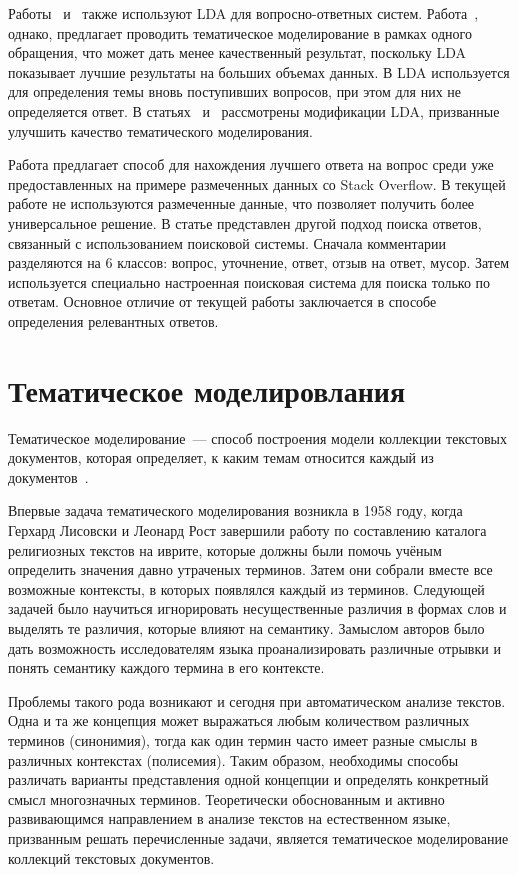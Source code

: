 Работы~\cite{LDA1} и~\cite{LDA2} также используют LDA для вопросно-ответных систем. Работа~\cite{LDA1}, однако, предлагает проводить тематическое моделирование в рамках одного обращения, что может дать менее качественный результат, поскольку LDA показывает лучшие результаты на больших объемах данных. В \cite{LDA2} LDA используется для определения темы вновь поступивших вопросов, при этом для них не определяется ответ. В статьях~\cite{TMuse} и~\cite{2016lda} рассмотрены модификации LDA, призванные улучшить качество тематического моделирования.

Работа \cite{so} предлагает способ для нахождения лучшего ответа  на вопрос среди уже предоставленных на примере размеченных данных со Stack Overflow. В текущей работе не используются размеченные данные, что позволяет получить более универсальное решение. В статье \cite{engine} представлен другой подход поиска ответов, связанный с использованием поисковой системы. Сначала комментарии разделяются на 6 классов: вопрос, уточнение, ответ, отзыв на ответ, мусор. Затем используется специально настроенная поисковая система для поиска только по ответам. Основное отличие от текущей работы заключается в способе определения релевантных ответов.

\section{Тематическое моделировлания}
\label{sec:overview_tm}

Тематическое моделирование~--- способ построения модели коллекции текстовых документов, которая определяет, к каким темам относится каждый из документов~\cite{TM}. 

Впервые задача тематического моделирования возникла в 1958 году, когда Герхард Лисовски и Леонард Рост завершили работу по составлению каталога религиозных текстов на иврите, которые должны были помочь учёным определить значения давно утраченых терминов. Затем они собрали вместе все возможные контексты, в которых появлялся каждый из терминов. Следующей задачей было научиться игнорировать несущественные различия в формах слов и выделять те различия, которые влияют на семантику. Замыслом авторов было дать возможность исследователям языка проанализировать различные отрывки и понять семантику каждого термина в его контексте. 

Проблемы такого рода возникают и сегодня при автоматическом анализе текстов. Одна и та же концепция может выражаться любым количеством различных терминов (синонимия), тогда как один термин часто имеет разные смыслы в различных контекстах (полисемия). Таким образом, необходимы способы различать варианты представления одной концепции и определять конкретный смысл многозначных терминов. Теоретически обоснованным и активно развивающимся направлением в анализе текстов на естественном языке, призванным решать перечисленные задачи, является тематическое моделирование коллекций текстовых документов.   

